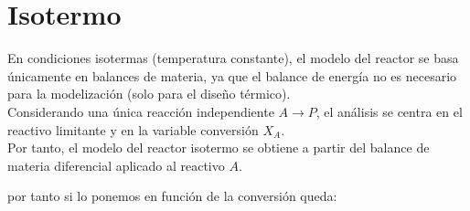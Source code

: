 \section{Isotermo}
\begin{flushleft}
    En condiciones isotermas (temperatura constante), el modelo del reactor se basa únicamente en balances de materia, ya que el balance de energía no es necesario para la modelización (solo para el diseño térmico).\\
    \vspace{1em}
    Considerando una única reacción independiente $A \rightarrow P$, el análisis se centra en el reactivo limitante y en la variable conversión $X_A$.\\
    \vspace{1em}
    Por tanto, el modelo del reactor isotermo se obtiene a partir del balance de materia diferencial aplicado al reactivo $A$.
\end{flushleft}
por tanto si lo ponemos en función de la conversión queda:

